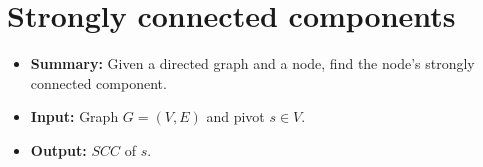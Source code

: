 \section{Strongly connected components}
\begin{itemize}
    \item \textbf{Summary:} Given a directed graph and a node, find the node's strongly connected component.
    \item \textbf{Input:} Graph $G=(V,E)$ and pivot $s \in V$.
    \item \textbf{Output:} $SCC$ of $s$.
\end{itemize}



